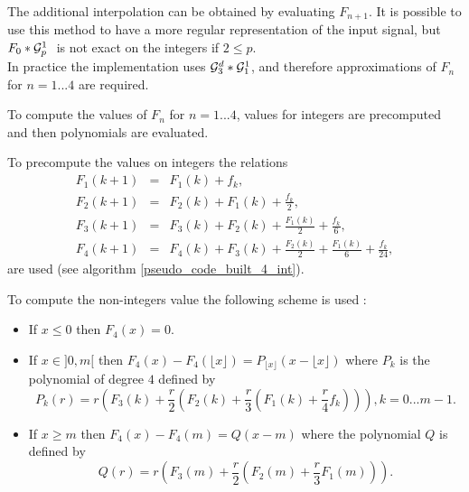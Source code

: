 The additional interpolation can be obtained by evaluating $F_{n+1}$.
It is possible to use this method to have a more regular representation of the input signal, but $F_0 * \mathcal{G}_p^1~$ is not exact on the integers if $2\le p$.\\
In practice the implementation uses $\mathcal{G}_3^d * \mathcal{G}_1^1$, and therefore approximations of $F_n$ for $n=1...4$ are required.



To compute the values of $F_n$ for $n=1...4$, values for integers are precomputed and then polynomials are evaluated.


To precompute the values on integers the relations
\begin{eqnarray*}
F_{1}(k+1)&=&  F_{1}(k)+f_{k} , \\
F_{2}(k+1)&=&  F_{2}(k)+F_{1}(k)+\frac{f_{k}}{2} ,  \\
F_{3}(k+1)&=&  F_{3}(k)+F_{2}(k)+\frac{F_{1}(k)}{2}+\frac{f_{k}}{6}  , \\
F_{4}(k+1)&=&  F_{4}(k)+F_{3}(k)+\frac{F_{2}(k)}{2}+\frac{F_{1}(k)}{6}+\frac{f_{k}}{24}  ,
\end{eqnarray*}
are used (see algorithm \ref{pseudo_code_built_4_int}).



To compute the non-integers value the following scheme is used :

\begin{itemize}
\item If $x\le 0$ then $F_{4}(x)=0$.
\item If $x\in ]0 , m[$ then $F_{4}(x)-F_{4}(\lfloor x \rfloor)=P_{\lfloor x \rfloor}(x-\lfloor x \rfloor)$ where $P_k$ is the polynomial of degree $4$ defined by
\begin{equation*}
P_k (r) =r \left( F_{3}(k) +\frac{r}{2} \left(F_{2}(k)+ \frac{r}{3}\left(F_{1}(k)+\frac{r}{4} f_{k}\right)\right)\right), k=0...m-1.
\end{equation*}
\item If $x\ge m$ then $F_{4}(x)-F_{4}(m)=Q(x-m)$ where the polynomial $Q$ is defined by
\begin{equation*}
Q(r)=r \left(F_{3}(m)+\frac{r}{2} \left( F_{2}(m) + \frac{r}{3} F_1 (m)\right)\right).
\end{equation*}\
\end{itemize}

